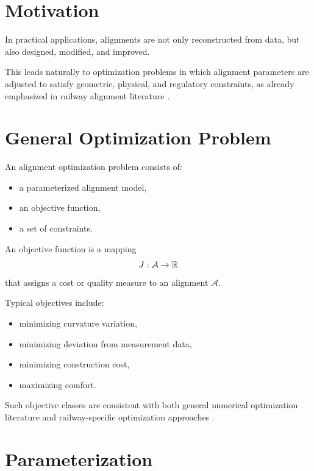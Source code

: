 
\section*{Motivation}

In practical applications, alignments are not only reconstructed from
data, but also designed, modified, and improved.

This leads naturally to optimization problems in which alignment
parameters are adjusted to satisfy geometric, physical, and regulatory
constraints, as already emphasized in railway alignment literature
\cite{Kufver2000RailwayAlignment,Klein1998Trassierung}.

\section{General Optimization Problem}

\begin{definition}
An alignment optimization problem consists of:
\begin{itemize}
\item a parameterized alignment model,
\item an objective function,
\item a set of constraints.
\end{itemize}
\end{definition}

\begin{definition}
An objective function is a mapping
\[
J : \mathcal{A} \to \mathbb{R}
\]
that assigns a cost or quality measure to an alignment $\mathcal{A}$.
\end{definition}

Typical objectives include:
\begin{itemize}
\item minimizing curvature variation,
\item minimizing deviation from measurement data,
\item minimizing construction cost,
\item maximizing comfort.
\end{itemize}
Such objective classes are consistent with both general numerical
optimization literature \cite{Nocedal2006NumericalOptimization}
and railway-specific optimization approaches
\cite{Kufver2000RailwayAlignment}.

\section{Parameterization}

